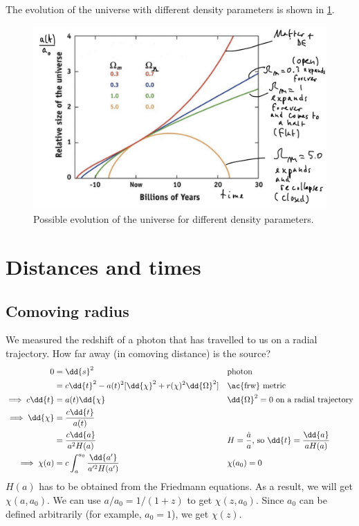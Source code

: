 The evolution of the universe with different density parameters is shown in \cref{fig:evolution}.

\begin{figure}
	\centering
	\includegraphics[width=\textwidth]{img/ch-02/evolution.png}
	\caption{Possible evolution of the universe for different density parameters.}
	\label{fig:evolution}
\end{figure}




\section{Distances and times}

\subsection{Comoving radius}
We measured the redshift of a photon that has travelled to us on a radial trajectory. How far away (in comoving distance) is the source?
\begin{align*}
	0 &= \dd{s}^2 &&\text{photon}\\
	&= c \dd{t}^2 - a(t)^2 [\dd{\chi}^2 + r(\chi)^2 \dd{\Omega}^2] &&\text{\ac{frw} metric}\\
	\implies c \dd{t} &= a(t) \dd{\chi} &&\dd{\Omega}^2 = 0 \text{ on a radial trajectory}\\
	\implies \dd{\chi} &= \frac{c \dd{t}}{a(t)}\\
	&= \frac{c \dd{a}}{a^2 H(a)} && H = \frac{\dot{a}}{a} \text{, so } \dd{t} = \frac{\dd{a}}{a H(a)}\\
	\implies \chi(a) &= c \int_a^{a_0} \frac{\dd{a'}}{a'^2 H(a')} && \chi(a_0) = 0
\end{align*}
$H(a)$ has to be obtained from the Friedmann equations. As a result, we will get $\chi(a,a_0)$. We can use $a/a_0 = 1/(1+z)$ to get $\chi(z,a_0)$. Since $a_0$ can be defined arbitrarily (for example, $a_0=1$), we get $\chi(z)$.

